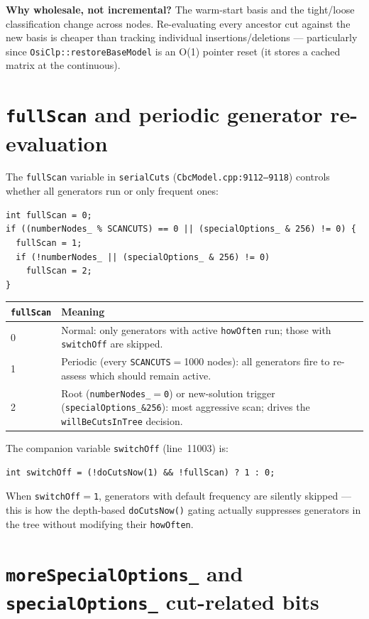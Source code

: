 \documentclass[11pt,a4paper]{article}
\begin{document}
\textbf{Why wholesale, not incremental?}  The warm-start basis and
the tight/loose classification change across nodes.  Re-evaluating
every ancestor cut against the new basis is cheaper than tracking
individual insertions/deletions --- particularly since
\texttt{OsiClp::restoreBaseModel} is an O(1) pointer reset (it
stores a cached matrix at the continuous).

\section{\texttt{fullScan} and periodic generator re-evaluation}
\label{sec:fullscan}

The \texttt{fullScan} variable in \texttt{serialCuts}
(\texttt{CbcModel.cpp:9112--9118}) controls whether all generators
run or only frequent ones:

\begin{lstlisting}
int fullScan = 0;
if ((numberNodes_ % SCANCUTS) == 0 || (specialOptions_ & 256) != 0) {
  fullScan = 1;
  if (!numberNodes_ || (specialOptions_ & 256) != 0)
    fullScan = 2;
}
\end{lstlisting}

\begin{tabular}{ll}
\toprule
\texttt{fullScan} & Meaning\\
\midrule
0 & Normal: only generators with active \texttt{howOften} run; those
    with \texttt{switchOff} are skipped.\\
1 & Periodic (every \texttt{SCANCUTS}$=$1000 nodes): all generators
    fire to re-assess which should remain active.\\
2 & Root (\texttt{numberNodes\_$=$0}) or new-solution trigger
    (\texttt{specialOptions\_\&256}): most aggressive scan; drives
    the \texttt{willBeCutsInTree} decision.\\
\bottomrule
\end{tabular}

The companion variable \texttt{switchOff} (line~11003) is:
\begin{lstlisting}
int switchOff = (!doCutsNow(1) && !fullScan) ? 1 : 0;
\end{lstlisting}
When \texttt{switchOff$=$1}, generators with default frequency are
silently skipped --- this is how the depth-based
\texttt{doCutsNow()} gating actually suppresses generators in the
tree without modifying their \texttt{howOften}.

\section{\texttt{moreSpecialOptions\_} and \texttt{specialOptions\_}
         cut-related bits}
\label{sec:specbits}
\end{document}
